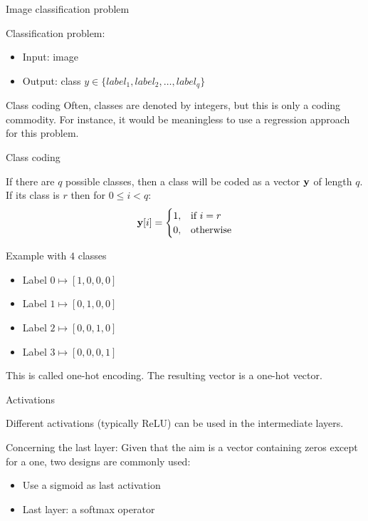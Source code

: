 \documentclass[xcolor=pdftex,dvipsnames,table,mathserif]{beamer}
\begin{document}
\begin{frame}{Image classification problem}

  Classification problem:
  \begin{itemize}
  \item Input: image
  \item Output: class $y \in \{ label_1, label_2, \ldots, label_q\}$
  \end{itemize}

  \begin{block}{Class coding}
    Often, classes are denoted by integers, but this is only a coding commodity. For instance, it would be meaningless to use a regression approach for this problem.
  \end{block}

\end{frame}

\begin{frame}{Class coding}

  If there are $q$ possible classes, then a class will be coded as a vector $\mathbf{y}$ of length $q$. If its class is $r$  then for $0 \leq i < q$:
  \[
  \mathbf{y}[i] =
  \begin{cases}
    1, & \text{if}\ i=r \\
    0, & \text{otherwise}
  \end{cases}
  \]

  \begin{block}{Example with $4$ classes}
    \begin{itemize}
    \item
      Label $0 \longmapsto [1,0,0,0]$
    \item
      Label $1 \longmapsto [0,1,0,0]$
    \item
      Label $2 \longmapsto [0,0,1,0]$
    \item
      Label $3 \longmapsto [0,0,0,1]$
    \end{itemize}
  \end{block}

  This is called \alert{one-hot encoding}. The resulting vector is a one-hot vector.

\end{frame}


\begin{frame}{Activations}

  Different activations (typically ReLU) can be used in the intermediate layers.
  \vspace{1em}

  Concerning the last layer: Given that the aim is a vector containing zeros except for a one, two designs are commonly used:

  \begin{itemize}
  \item Use a sigmoid as last activation
  \item Last layer: a softmax operator
  \end{itemize}

\end{frame}
\end{document}
